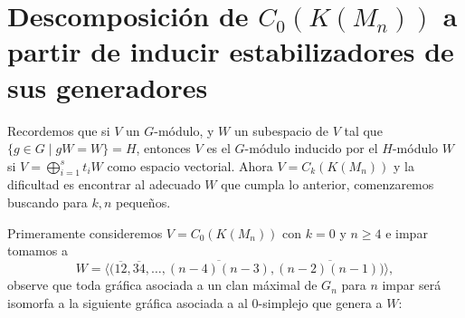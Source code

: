 \documentclass[12pt]{book}
\theoremstyle{definition}
\newcounter{in}
\begin{document}
\section{Descomposición de $C_{0}(K(M_n))$ a partir de inducir estabilizadores de sus generadores}

\label{Ind_est_z}
  Recordemos que si $V$ un $G$-módulo, y $W$ un subespacio de $V$ tal que $\{g\in
  G\mid gW=W\}=H$, entonces $V$ es el $G$-módulo inducido por el $H$-módulo $W$ si
  $V=\bigoplus^{s}_{i=1}t_{i}W$ como espacio vectorial. Ahora $V = C_{k}(K(M_n))$ y la dificultad es encontrar al adecuado $W$ que cumpla lo anterior, comenzaremos buscando para $k,n$ pequeños.
  
  Primeramente consideremos $V = C_{0}(K(M_n))$ con $k=0$ y $n \geq 4$ e impar tomamos a
  $$W = \langle (\overline{12},\overline{34},\ldots,\overline{(n-4)(n-3)}, \overline{(n-2)(n-1))} \rangle,$$
  observe que toda gráfica asociada a un clan máximal de $G_{n}$ para $n$ impar será isomorfa a la siguiente gráfica asociada a al $0$-simplejo que genera a $W$:
   \begin{center}
\end{center}
\end{document}

